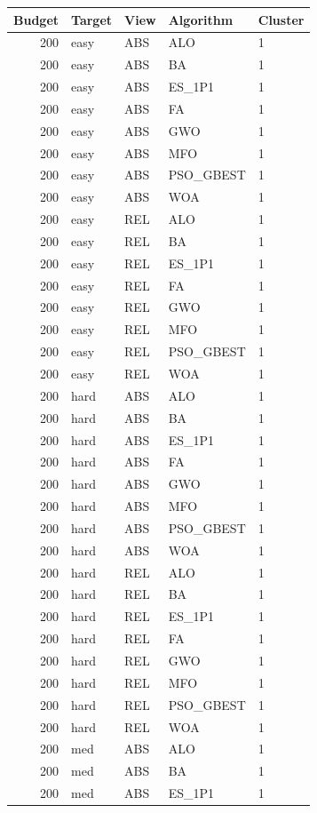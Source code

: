 \begin{tabular}{r l l l l}
\hline
Budget & Target & View & Algorithm & Cluster \\
\hline
200 & easy & ABS & ALO & 1 \\
200 & easy & ABS & BA & 1 \\
200 & easy & ABS & ES_1P1 & 1 \\
200 & easy & ABS & FA & 1 \\
200 & easy & ABS & GWO & 1 \\
200 & easy & ABS & MFO & 1 \\
200 & easy & ABS & PSO_GBEST & 1 \\
200 & easy & ABS & WOA & 1 \\
200 & easy & REL & ALO & 1 \\
200 & easy & REL & BA & 1 \\
200 & easy & REL & ES_1P1 & 1 \\
200 & easy & REL & FA & 1 \\
200 & easy & REL & GWO & 1 \\
200 & easy & REL & MFO & 1 \\
200 & easy & REL & PSO_GBEST & 1 \\
200 & easy & REL & WOA & 1 \\
200 & hard & ABS & ALO & 1 \\
200 & hard & ABS & BA & 1 \\
200 & hard & ABS & ES_1P1 & 1 \\
200 & hard & ABS & FA & 1 \\
200 & hard & ABS & GWO & 1 \\
200 & hard & ABS & MFO & 1 \\
200 & hard & ABS & PSO_GBEST & 1 \\
200 & hard & ABS & WOA & 1 \\
200 & hard & REL & ALO & 1 \\
200 & hard & REL & BA & 1 \\
200 & hard & REL & ES_1P1 & 1 \\
200 & hard & REL & FA & 1 \\
200 & hard & REL & GWO & 1 \\
200 & hard & REL & MFO & 1 \\
200 & hard & REL & PSO_GBEST & 1 \\
200 & hard & REL & WOA & 1 \\
200 & med & ABS & ALO & 1 \\
200 & med & ABS & BA & 1 \\
200 & med & ABS & ES_1P1 & 1 \\

\end{tabular}
